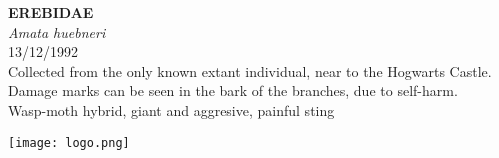 \documentclass[
  landscape]{article}
\begin{document}
\begin{mdframed}[linecolor=mycolortext, linewidth=2pt, backgroundcolor=mycolor]

  \bigskip
  \begin{flushright}
  \begin{minipage}[t][-50ex][t]{16em}  
  \end{minipage}
  \end{flushright}
  \bigskip
  \begin{adjustwidth}{1cm}{1cm}
  {\fontsize{50pt}{0pt}\selectfont\bf\textcolor{mycolortext}{ EREBIDAE }} \\
  \linebreak
  \linebreak
  {\fontsize{40pt}{100pt}\selectfont\textcolor{mycolortext}{\emph{ Amata huebneri }}} \\
  \vfill
  {\fontsize{30pt}{100pt}\selectfont\textcolor{mycolortext}{ 13/12/1992 }} \\
  \vfill
  {\fontsize{30pt}{100pt}\selectfont\textcolor{mycolortext}{ Collected from the only known extant individual, near to the Hogwarts Castle. Damage marks can be seen in the bark of the branches, due to self-harm. }} \\
  \vfill
  {\fontsize{30pt}{50pt}\selectfont\textcolor{mycolortext}{ Wasp-moth hybrid, giant and aggresive, painful sting }} \\
  \end{adjustwidth}
  \begin{center}
  \texttt{[image: logo.png]}
  \end{center}
  \end{mdframed}
  \pagebreak

\end{document}
